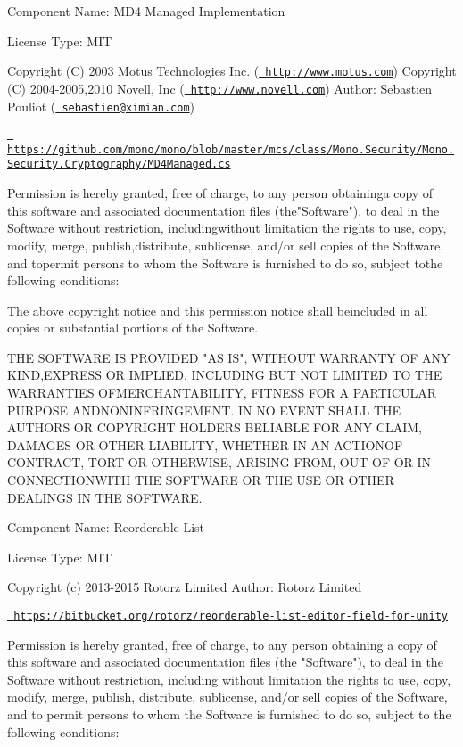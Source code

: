  Component Name\+: MD4 Managed Implementation

License Type\+: MIT

Copyright (C) 2003 Motus Technologies Inc. (\href{http://www.motus.com}{\texttt{ http\+://www.\+motus.\+com}}) Copyright (C) 2004-\/2005,2010 Novell, Inc (\href{http://www.novell.com}{\texttt{ http\+://www.\+novell.\+com}}) Author\+: Sebastien Pouliot (\href{mailto:sebastien@ximian.com}{\texttt{ sebastien@ximian.\+com}})

\href{https://github.com/mono/mono/blob/master/mcs/class/Mono.Security/Mono.Security.Cryptography/MD4Managed.cs}{\texttt{ https\+://github.\+com/mono/mono/blob/master/mcs/class/\+Mono.\+Security/\+Mono.\+Security.\+Cryptography/\+MD4\+Managed.\+cs}}

Permission is hereby granted, free of charge, to any person obtaininga copy of this software and associated documentation files (the"{}\+Software"{}), to deal in the Software without restriction, includingwithout limitation the rights to use, copy, modify, merge, publish,distribute, sublicense, and/or sell copies of the Software, and topermit persons to whom the Software is furnished to do so, subject tothe following conditions\+:

The above copyright notice and this permission notice shall beincluded in all copies or substantial portions of the Software.

THE SOFTWARE IS PROVIDED "{}\+AS IS"{}, WITHOUT WARRANTY OF ANY KIND,EXPRESS OR IMPLIED, INCLUDING BUT NOT LIMITED TO THE WARRANTIES OFMERCHANTABILITY, FITNESS FOR A PARTICULAR PURPOSE ANDNONINFRINGEMENT. IN NO EVENT SHALL THE AUTHORS OR COPYRIGHT HOLDERS BELIABLE FOR ANY CLAIM, DAMAGES OR OTHER LIABILITY, WHETHER IN AN ACTIONOF CONTRACT, TORT OR OTHERWISE, ARISING FROM, OUT OF OR IN CONNECTIONWITH THE SOFTWARE OR THE USE OR OTHER DEALINGS IN THE SOFTWARE.

 Component Name\+: Reorderable List

License Type\+: MIT

Copyright (c) 2013-\/2015 Rotorz Limited Author\+: Rotorz Limited

\href{https://bitbucket.org/rotorz/reorderable-list-editor-field-for-unity}{\texttt{ https\+://bitbucket.\+org/rotorz/reorderable-\/list-\/editor-\/field-\/for-\/unity}}

Permission is hereby granted, free of charge, to any person obtaining a copy of this software and associated documentation files (the "{}\+Software"{}), to deal in the Software without restriction, including without limitation the rights to use, copy, modify, merge, publish, distribute, sublicense, and/or sell copies of the Software, and to permit persons to whom the Software is furnished to do so, subject to the following conditions\+:


